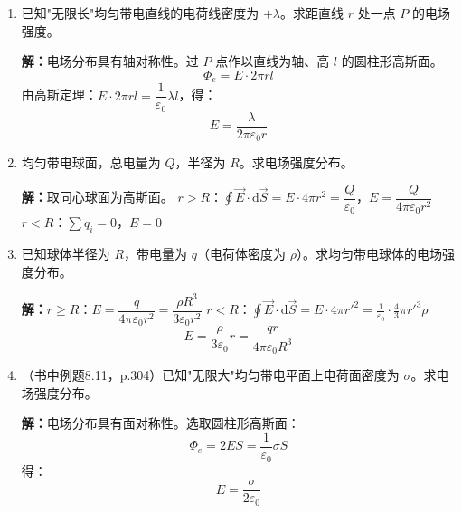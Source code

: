 \documentclass{ctexart}
\begin{document}
\begin{enumerate}
\textbf{解：}并联前：$W_1 = \dfrac12 C_1 u_1^{2} = 0.005\,\text{J}$，$W_2 = \dfrac12 C_2 u_2^{2} = 0.04\,\text{J}$
总能量 $W = 0.045\,\text{J}$。
并联后：$C = C_1 + C_2 = 3\,\mu\text{F}$，$Q = C_1 u_1 + C_2 u_2 = 5\times10^{-4}\,\text{C}$
\[
W' = \frac{Q^{2}}{2C} = \frac{(5\times10^{-4})^{2}}{2\times3\times10^{-6}} = 0.042\,\text{J}
\]

\item 已知"无限长"均匀带电直线的电荷线密度为 $+\lambda$。求距直线 $r$ 处一点 $P$ 的电场强度。

\textbf{解：}电场分布具有轴对称性。过 $P$ 点作以直线为轴、高 $l$ 的圆柱形高斯面。
\[
\Phi_e = E\cdot 2\pi r l
\]
由高斯定理：$E\cdot 2\pi r l = \dfrac{1}{\varepsilon_0}\lambda l$，得：
\[
E = \frac{\lambda}{2\pi\varepsilon_0 r}
\]

\item 均匀带电球面，总电量为 $Q$，半径为 $R$。求电场强度分布。

\textbf{解：}取同心球面为高斯面。
$r > R$：$\displaystyle\oint\vec{E}\cdot\mathrm{d}\vec{S} = E\cdot 4\pi r^{2} = \dfrac{Q}{\varepsilon_0}$，$E = \dfrac{Q}{4\pi\varepsilon_0 r^{2}}$
$r < R$：$\sum q_i = 0$，$E = 0$

\item 已知球体半径为 $R$，带电量为 $q$（电荷体密度为 $\rho$）。求均匀带电球体的电场强度分布。

\textbf{解：}$r \ge R$：$E = \dfrac{q}{4\pi\varepsilon_0 r^{2}} = \dfrac{\rho R^{3}}{3\varepsilon_0 r^{2}}$
$r < R$：$\displaystyle\oint\vec{E}\cdot\mathrm{d}\vec{S} = E\cdot 4\pi r'^{2} = \frac{1}{\varepsilon_0}\cdot\frac{4}{3}\pi r'^{3}\rho$
\[
E = \frac{\rho}{3\varepsilon_0}r = \frac{qr}{4\pi\varepsilon_0 R^{3}}
\]

\item（书中例题8.11，p.304）已知"无限大"均匀带电平面上电荷面密度为 $\sigma$。求电场强度分布。

\textbf{解：}电场分布具有面对称性。选取圆柱形高斯面：
\[
\Phi_e = 2ES = \frac{1}{\varepsilon_0}\sigma S
\]
得：
\[
E = \frac{\sigma}{2\varepsilon_0}
\]

\end{enumerate}
\end{document}
